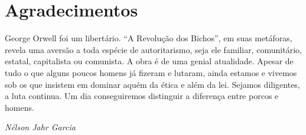 \chapter*{Agradecimentos}

George Orwell foi um libertário. \enquote{A Revolução dos Bichos}, em suas metáforas, revela uma aversão a toda espécie de autoritarismo, seja ele familiar, comunitário, estatal, capitalista ou comunista. A obra é de uma genial atualidade. Apesar de tudo o que alguns poucos homens já fizeram e lutaram, ainda estamos e vivemos sob os que insistem em dominar aquém da ética e além da lei. Sejamos diligentes, a luta continua. Um dia conseguiremos distinguir a diferença entre porcos e homens.

\textit{Nélson Jahr Garcia}

\clearpage
